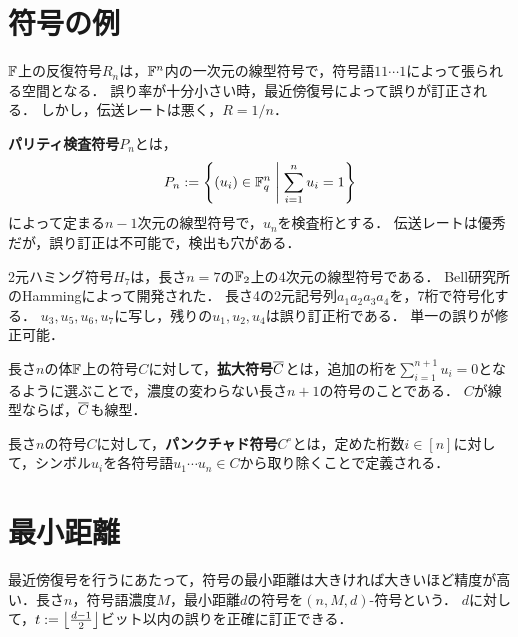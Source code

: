 \documentclass[uplatex,dvipdfmx]{jsreport}
\begin{document}
\section{符号の例}

\begin{example}
    $\mathbb{F}$上の反復符号$R_n$は，$\mathbb{F}^n$内の一次元の線型符号で，符号語$11\cdots 1$によって張られる空間となる．
    誤り率が十分小さい時，最近傍復号によって誤りが訂正される．
    しかし，伝送レートは悪く，$R=1/n$．
\end{example}

\begin{example}
    \textbf{パリティ検査符号}$P_n$とは，
    \[P_n:=\left\{(u_i)\in\mathbb{F}_q^n\;\middle|\;\sum_{i=1}^nu_i=1\right\}\]
    によって定まる$n-1$次元の線型符号で，$u_n$を検査桁とする．
    伝送レートは優秀だが，誤り訂正は不可能で，検出も穴がある．
\end{example}

\begin{example}
    2元ハミング符号$H_7$は，長さ$n=7$の$\mathbb{F}_2$上の$4$次元の線型符号である．
    Bell研究所のHammingによって開発された．
    長さ4の2元記号列$a_1a_2a_3a_4$を，7桁で符号化する．
    $u_3,u_5,u_6,u_7$に写し，残りの$u_1,u_2,u_4$は誤り訂正桁である．
    単一の誤りが修正可能．
\end{example}

\begin{example}
    長さ$n$の体$\mathbb{F}$上の符号$C$に対して，\textbf{拡大符号}$\overline{C}$とは，追加の桁を$\sum_{i=1}^{n+1}u_i=0$となるように選ぶことで，濃度の変わらない長さ$n+1$の符号のことである．
    $C$が線型ならば，$\overline{C}$も線型．
\end{example}

\begin{example}
    長さ$n$の符号$C$に対して，\textbf{パンクチャド符号}$C^\circ$とは，定めた桁数$i\in[n]$に対して，シンボル$u_i$を各符号語$u_1\cdots u_n\in C$から取り除くことで定義される．
\end{example}

\section{最小距離}

\begin{tcolorbox}[colframe=ForestGreen, colback=ForestGreen!10!white,breakable,colbacktitle=ForestGreen!40!white,coltitle=black,fonttitle=\bfseries\sffamily,
title=誤り訂正の精度を上げる技法]
    最近傍復号を行うにあたって，符号の最小距離は大きければ大きいほど精度が高い．長さ$n$，符号語濃度$M$，最小距離$d$の符号を$(n,M,d)$-符号という．
    $d$に対して，$t:=\left\lfloor\frac{d-1}{2}\right\rfloor$ビット以内の誤りを正確に訂正できる．
\end{tcolorbox}
\end{document}
